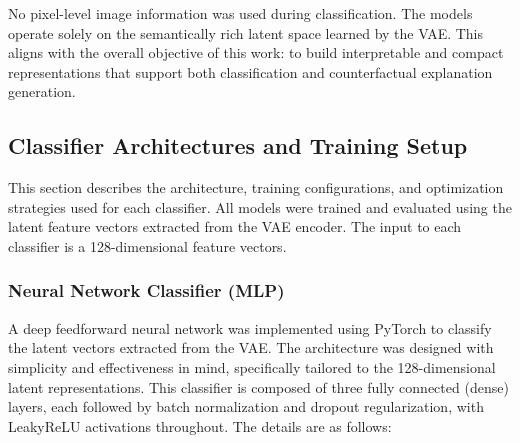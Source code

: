 No pixel-level image information was used during classification. The models operate solely on the semantically rich latent space learned by the VAE. This aligns with the overall objective of this work: to build interpretable and compact representations that support both classification and counterfactual explanation generation.

\subsection{Classifier Architectures and Training Setup}

This section describes the architecture, training configurations, and optimization strategies used for each classifier. All models were trained and evaluated using the latent feature vectors extracted from the VAE encoder. The input to each classifier is a 128-dimensional feature vectors.

\subsubsection*{Neural Network Classifier (MLP)}

A deep feedforward neural network was implemented using PyTorch to classify the latent vectors extracted from the VAE. The architecture was designed with simplicity and effectiveness in mind, specifically tailored to the 128-dimensional latent representations. This classifier is composed of three fully connected (dense) layers, each followed by batch normalization and dropout regularization, with LeakyReLU activations throughout. The details are as follows:

